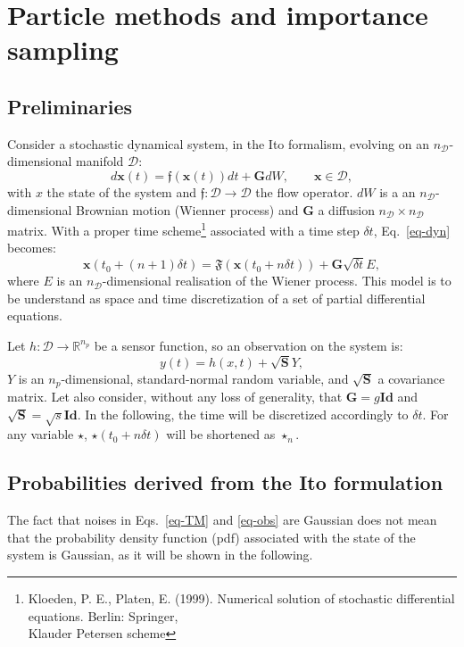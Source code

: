 \documentclass[aip,pof,nofootinbib,reprint,onecolumn]{revtex4-1}
\newcommand{\gras}[1]{\boldsymbol{#1}}
\newcommand{\mypar}[1]{\left(#1\right)}
\newcommand{\Ephaz}{\mathcal{D}}%
\newcommand{\Nphaz}{n_{\mathcal{D}}} %
\newcommand{\Nm}{n_p} %
\newcommand{\flot}{\mathfrak{f}} %
\newcommand{\fint}{\mathfrak{F}} %
\newcommand{\obs}{y} %
\newcommand{\point}{\gras{x}} %
\begin{document}
%
\section{Particle methods and importance sampling}
\label{sec-ipf}
\subsection{Preliminaries}
Consider a stochastic dynamical system, in the Ito formalism, evolving on an $\Nphaz$-dimensional manifold $\Ephaz$:
\begin{equation}
d \point\mypar{t} = \flot\mypar{\point\mypar{t}}dt + \gras{G}dW, \qquad \point \in \Ephaz,
\label{eq-dyn}
\end{equation}
with $x$ the state of the system and $\flot:\Ephaz \rightarrow \Ephaz$ the flow operator. $dW$ is a an $\Nphaz$-dimensional Brownian motion (Wienner process) and $\gras{G}$ a diffusion $\Nphaz\times \Nphaz$ matrix.
With a proper time scheme\footnote{Kloeden, P. E.,  Platen, E. (1999). Numerical solution of stochastic differential equations. Berlin:
Springer,\\ Klauder Petersen scheme} associated with a time step $\delta t$, Eq.~\eqref{eq-dyn}  becomes:
\begin{equation}
\point\mypar{t_0+\mypar{n+1}\delta t} =  \fint\mypar{\point\mypar{t_0+n\delta t}}+\gras{G}\sqrt{\delta t} E,
\label{eq-TM}
\end{equation}
where $E$ is an $\Nphaz$-dimensional realisation of the Wiener process. 
This model is to be understand as space and time discretization of a set of partial differential equations.

Let $h:\Ephaz \rightarrow \mathbb{R}^{\Nm}$ be a sensor function, so an observation on the system is:
\begin{equation}
 \obs(t) = h\mypar{x,t} + \sqrt{\gras{S}}Y,
\label{eq-obs}
\end{equation}
$Y$ is an $\Nm$-dimensional, standard-normal random variable, and $\sqrt{\gras{S}}$ a covariance matrix. 
Let also consider, without any loss of generality, that $\gras{G} = g \gras{Id}$ and $\sqrt{\gras{S}} = \sqrt{s} \gras{Id}$.
In the following, the time will be discretized accordingly to $\delta t$. For any variable $\star$, $ \star\mypar{t_0+n\delta t}$ will be shortened as $ \star_n$.





\subsection{Probabilities derived from the Ito formulation}
The fact that noises in Eqs.~\eqref{eq-TM} and \eqref{eq-obs} are Gaussian does not mean that the probability density function (pdf) associated with the state of the system is Gaussian, as it will be shown in the following.
\end{document}
